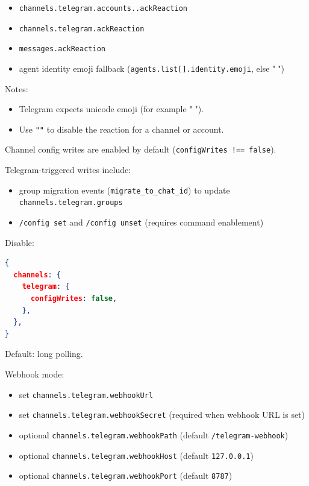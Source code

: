 \begin{itemize}
  \item \texttt{channels.telegram.accounts..ackReaction}
  \item \texttt{channels.telegram.ackReaction}
  \item \texttt{messages.ackReaction}
  \item agent identity emoji fallback (\texttt{agents.list[].identity.emoji}, else "👀")
\end{itemize}


Notes:

\begin{itemize}
  \item Telegram expects unicode emoji (for example "👀").
  \item Use \texttt{""} to disable the reaction for a channel or account.
\end{itemize}



Channel config writes are enabled by default (\texttt{configWrites !== false}).

Telegram-triggered writes include:

\begin{itemize}
  \item group migration events (\texttt{migrate\_to\_chat\_id}) to update \texttt{channels.telegram.groups}
  \item \texttt{/config set} and \texttt{/config unset} (requires command enablement)
\end{itemize}


Disable:

\begin{lstlisting}[language=json]
{
  channels: {
    telegram: {
      configWrites: false,
    },
  },
}
\end{lstlisting}



Default: long polling.

Webhook mode:

\begin{itemize}
  \item set \texttt{channels.telegram.webhookUrl}
  \item set \texttt{channels.telegram.webhookSecret} (required when webhook URL is set)
  \item optional \texttt{channels.telegram.webhookPath} (default \texttt{/telegram-webhook})
  \item optional \texttt{channels.telegram.webhookHost} (default \texttt{127.0.0.1})
  \item optional \texttt{channels.telegram.webhookPort} (default \texttt{8787})
\end{itemize}


